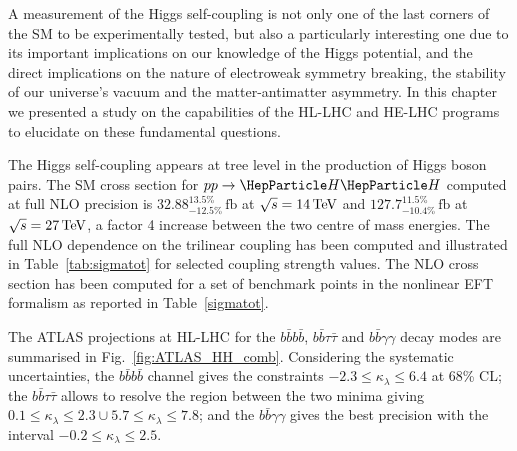 \documentclass[../report.tex]{subfiles}
\providecommand{\main}{..}
\begin{document}
\label{sec:HH_implications}




\label{sec:HH_EWPT}





A measurement of the Higgs self-coupling is not only one of the last corners of the SM to be experimentally tested, but also a particularly interesting one due to its important implications on our knowledge of the Higgs potential, and the direct implications on the nature of electroweak symmetry breaking, the stability of our universe's vacuum and the matter-antimatter asymmetry. In this chapter we presented a study on the capabilities of the HL-LHC and HE-LHC programs to elucidate on these fundamental questions.

The Higgs self-coupling appears at tree level in the production of Higgs boson pairs. The SM cross section for $pp\to \HH$ computed at full NLO precision is $32.88^{13.5\%}_{-12.5\%}\,\text{fb}$ at $\sqrt{s}=14\,\text{\ensuremath{\text{TeV}}}$ and $127.7^{11.5\%}_{-10.4\%}\,\text{fb}$ at $\sqrt{s}=27\,\text{\ensuremath{\text{TeV}}}$, a factor 4 increase between the two centre of mass energies. The full NLO dependence on the trilinear coupling has been computed and illustrated in Table~\ref{tab:sigmatot} for selected coupling strength values. The NLO cross section has been computed for a set of benchmark points in the nonlinear EFT formalism as reported in Table~\ref{sigmatot}.

The ATLAS projections at HL-LHC for the $b\bar{b}b\bar{b}$, $b\bar{b}\tau\bar{\tau}$ and $b\bar{b}\gamma\gamma$ decay modes are summarised in Fig.~\ref{fig:ATLAS_HH_comb}. Considering the systematic uncertainties, the $b\bar{b}b\bar{b}$ channel gives the constraints $-2.3\leq \kappa_\lambda \leq 6.4$ at 68\% CL; the  $b\bar{b}\tau\bar{\tau}$ allows to resolve the region between the two minima giving $0.1\leq \kappa_\lambda\leq 2.3 \cup 5.7\leq \kappa_\lambda \leq 7.8$; and the $b\bar{b}\gamma\gamma$ gives the best precision with the interval $-0.2 \leq \kappa_\lambda \leq 2.5$.
\end{document}
